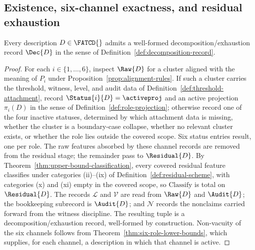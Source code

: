 \subsection{Existence, six-channel exactness, and residual exhaustion}\label{subsec:dec-theorems}

\begin{theorem}\label{thm:decomposition-existence}
Every description \(D \in \FATCD{}\) admits a well-formed decomposition/exhaustion
record \(\Dec{D}\) in the sense of
Definition~\ref{def:decomposition-record}.
\end{theorem}

\begin{proof}
For each \(i \in \{1,\ldots,6\}\), inspect \(\Raw{D}\) for a cluster
aligned with the meaning of \(P_i\) under
Proposition~\ref{prop:alignment-rules}. If such a cluster carries the
threshold, witness, level, and audit data of
Definition~\ref{def:threshold-attachment}, record
\(\Status{i}{D} = \activeproj\) and an active projection
\(\pi_i(D)\) in the sense of Definition~\ref{def:role-projection};
otherwise record one of the four inactive statuses, determined by
which attachment data is missing, whether the cluster is a
boundary-case collapse, whether no relevant cluster exists, or
whether the role lies outside the covered scope. Six status entries
result, one per role. The raw features absorbed by these channel
records are removed from the residual stage; the remainder pass to
\(\Residual{D}\). By Theorem~\ref{thm:upper-bound-classification},
every covered residual feature classifies under categories (ii)--(ix)
of Definition~\ref{def:residual-scheme}, with categories (x) and (xi)
empty in the covered scope, so \(\mathrm{Classify}\) is total on
\(\Residual{D}\). The records \(\mathcal{L}\) and \(\mathcal{V}\) are
read from \(\Raw{D}\) and \(\Audit{D}\); the bookkeeping subrecord is
\(\Audit{D}\); and \(\mathcal{N}\) records the nonclaims carried
forward from the witness discipline. The resulting tuple is a
decomposition/exhaustion record, well-formed by construction.
Non-vacuity of the six channels follows from
Theorem~\ref{thm:six-role-lower-bounds}, which supplies, for each
channel, a description in which that channel is active.
\end{proof}

